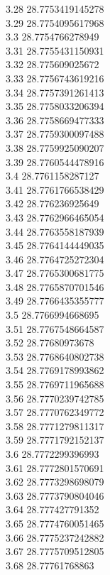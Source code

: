 {3.28	28.7753419145278\\
3.29	28.7754095617968\\
3.3	28.7754766278949\\
3.31	28.7755431150931\\
3.32	28.775609025672\\
3.33	28.7756743619216\\
3.34	28.7757391261413\\
3.35	28.7758033206394\\
3.36	28.7758669477333\\
3.37	28.7759300097488\\
3.38	28.7759925090207\\
3.39	28.7760544478916\\
3.4	28.7761158287127\\
3.41	28.7761766538429\\
3.42	28.776236925649\\
3.43	28.7762966465054\\
3.44	28.7763558187939\\
3.45	28.7764144449035\\
3.46	28.7764725272304\\
3.47	28.7765300681775\\
3.48	28.7765870701546\\
3.49	28.7766435355777\\
3.5	28.7766994668695\\
3.51	28.7767548664587\\
3.52	28.77680973678\\
3.53	28.7768640802738\\
3.54	28.7769178993862\\
3.55	28.7769711965688\\
3.56	28.7770239742785\\
3.57	28.7770762349772\\
3.58	28.7771279811317\\
3.59	28.7771792152137\\
3.6	28.7772299396993\\
3.61	28.7772801570691\\
3.62	28.7773298698079\\
3.63	28.7773790804046\\
3.64	28.777427791352\\
3.65	28.7774760051465\\
3.66	28.7775237242882\\
3.67	28.7775709512805\\
3.68	28.77761768863\\
}
